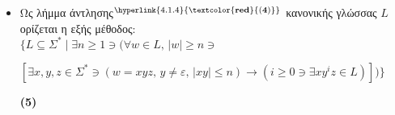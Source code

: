 \begin{tcolorbox}[colback=yellow!15!white, colframe=blue!50!white,
	fonttitle=\bfseries\Large, title = Απόδειξη - μέρος 1/3]
\begin{itemize}
		\item Ως λήμμα άντλησης$^{\hyperlink{4.1.4}{\bf{\textcolor{red}{(4)}}}}$ κανονικής γλώσσας $L$ ορίζεται η
		εξής μέθοδος:\\
		$\{L\subseteq \Sigma^* \mid \exists n \geq 1 \ni (\forall w \in
		L,\, \vert w\vert \geq n \ni $
		\reducevspace\reducevspace\reducevspace\reducevspace\reducevspace\reducevspace\reducevspace
		\reducevspace\reducevspace\reducevspace\reducevspace\reducevspace\reducevspace\reducevspace
		\begin{flushright}$[\exists x,y,z \in \Sigma^* \ni ( w = xyz,\, y \neq \mathcal{ε},\,
			\vert xy\vert \leq n) \rightarrow ( i \geq 0 \ni \exists xy^iz \in L)])\}$\end{flushright}
		\reducevspace\reducevspace\reducevspace\reducevspace\reducevspace\reducevspace\reducevspace
		\reducevspace\reducevspace\reducevspace\reducevspace\reducevspace\reducevspace\reducevspace
		\reducevspace\reducevspace\reducevspace\reducevspace\reducevspace\reducevspace\reducevspace
		\reducevspace\reducevspace\reducevspace\reducevspace\reducevspace\reducevspace\reducevspace
		\begin{flushright}\hypertarget{4.1.5}{\bf{(5)}}\end{flushright}

		\begin{comment}
		\item Ορίζουμε $\mathcal{L}_{regular}$ ως κανονική και $\mathcal{L}_{iregular}$ ως μη κανονική γλώσσα
		και\\
		$\mathcal{L}_{union} = \mathcal{L}_{regular} \cup \mathcal{L}_{irregular}$\\
		Θα υποθέσουμε ότι $\mathcal{P} = "\mathcal{L}_{union}$ είναι πάντα κανονική" όπως δηλαδή μας λέει ο
		ισχυρισμός.
		\end{comment}

		\begin{comment}
		\item Για σύνολα A, Β και C έχουμε\\
		$(Α \cup B) - C = (A \cup B) \cap C^c = (A \cap C^c) \cup (B \cap C^c) = (A-C) \cup (B-C)$ \\
		επιβεβαιώνουμε:\;
		$x \in [(A \cup B) - C] \Longleftrightarrow (x \in A \lor x \in B) \land x \notin C \Longleftrightarrow$\\
		 $(x\in A \lor x \in B) \land x \in C^c = (A) \overset{\text{επιμεριστική}}{\Longleftrightarrow}
		(x \in A \land x \in C^c) \lor (x \in B \land x \in C^c) \Longleftrightarrow$\\
		$(x \in A \land x \notin C)\lor (x \in B \land x \notin C) \Longleftrightarrow
		x \in (A-C) \lor x \in (B-C) \Longleftrightarrow$\\
		$x \in [(A-C) \cup (B-C)]$ άρα $(A \cup B) - C = (A-C) \cup (B-C)$
		\begin{flushright}(6)\end{flushright}



\end{comment}
\end{itemize}
\end{tcolorbox}
